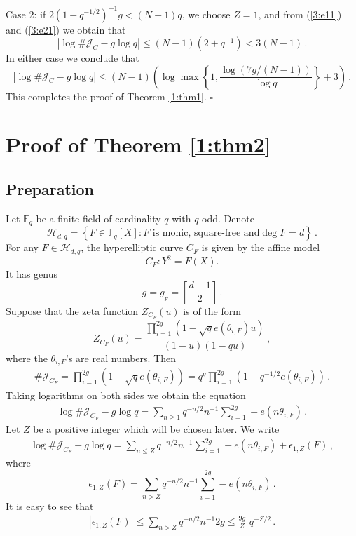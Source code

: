 \documentclass[12pt]{amsart}
\theoremstyle{plain}
\newcommand{\F}{{\mathbb F}_q}
\newcommand{\J}{\mathcal J}
\newcommand{\HH}{{\mathcal H}}
\begin{document}
Case 2: if $2\left(1-q^{-1/2}\right)^{-1}g < (N-1)q$, we choose $Z=1$, and from (\ref{3:e11}) and (\ref{3:e21}) we obtain that
\[\left|\log \#\J_C-g \log q\right|\le (N-1) \left(2+q^{-1}\right) < 3(N-1)\,.\]
In either case we conclude that
\[|\log \# \J_C- g \log q| \le \left(N-1\right)\left( \log \max \left\{1, \frac{\log(7g/(N-1))}{\log q}\right\}+3\right)\,.\]
This completes the proof of Theorem \ref{1:thm1}. \quad $\square$


\section{Proof of Theorem \ref{1:thm2}}

\subsection{Preparation} Let $\F$ be a finite field of cardinality $q$ with $q$ odd. Denote
\[\HH_{d,q}=\left\{F \in \F[X]: F \mbox{ is monic, square-free and} \deg F=d\right\}\,.\]
For any $F \in \HH_{d,q}$, the hyperelliptic curve $C_F$ is given by the affine model
\[C_F:Y^2=F(X).\]
It has genus
\[g=g_{_F}=\left[\frac{d-1}{2}\right]\,.\]
Suppose that the zeta function $Z_{C_F}(u)$ is of the form
\[Z_{C_F}(u) =\frac{\prod_{i=1}^{2g} \left(1-\sqrt{q}e\left(\theta_{i,F}\right) u\right)}{(1-u)(1-qu)}\,, \]
where the $\theta_{i,F}$'s are real numbers. Then
\begin{eqnarray*} \# \J_{C_F}=\prod_{i=1}^{2g} \left(1-\sqrt{q}e\left(\theta_{i,F}\right)\right) =q^g \prod_{i=1}^{2g} \left(1-q^{-1/2}e\left(\theta_{i,F}\right) \right)\,.\end{eqnarray*}
Taking logarithms on both sides we obtain the equation
\begin{eqnarray*}
\log \#\J_{C_F}-g \log q =\sum_{n \ge 1} q^{-n/2}n^{-1} \sum_{i=1}^{2g} -e\left(n \theta_{i,F}\right)\,.
\end{eqnarray*}
Let $Z$ be a positive integer which will be chosen later. %
We write
\begin{eqnarray} \label{4:jc}\log \#\J_{C_F}-g \log q=\sum_{n \le Z} q^{-n/2}n^{-1} \sum_{i=1}^{2g} -e\left(n \theta_{i,F}\right)+\epsilon_{1,Z}(F)\,,\end{eqnarray}
where
\[
\epsilon_{1,Z}(F)=\sum_{n > Z} q^{-n/2}n^{-1} \sum_{i=1}^{2g} -e\left(n \theta_{i,F}\right)\,.
\]
It is easy to see that
\begin{eqnarray*}
|\epsilon_{1,Z}(F)| \le \sum_{n > Z} q^{-n/2}n^{-1} 2g \le \frac{9g}{Z}\,\,q^{-Z/2}\,.
\end{eqnarray*}
\end{document}
